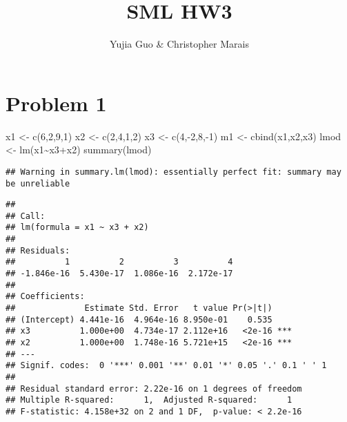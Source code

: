\documentclass[
  11pt,
]{article}
\title{SML HW3}
\author{Yujia Guo \& Christopher Marais}
\date{}
\newenvironment{Shaded}{\begin{snugshade}}{\end{snugshade}}
\newcommand{\DecValTok}[1]{\textcolor[rgb]{0.00,0.00,0.81}{#1}}
\newcommand{\FunctionTok}[1]{\textcolor[rgb]{0.00,0.00,0.00}{#1}}
\newcommand{\NormalTok}[1]{#1}
\newcommand{\OtherTok}[1]{\textcolor[rgb]{0.56,0.35,0.01}{#1}}
\newcommand{\SpecialCharTok}[1]{\textcolor[rgb]{0.00,0.00,0.00}{#1}}
\begin{document}
\maketitle

\hypertarget{problem-1}{%
\section{Problem 1}\label{problem-1}}

\begin{Shaded}
\begin{Highlighting}[]
\NormalTok{x1 }\OtherTok{\textless{}{-}} \FunctionTok{c}\NormalTok{(}\DecValTok{6}\NormalTok{,}\DecValTok{2}\NormalTok{,}\DecValTok{9}\NormalTok{,}\DecValTok{1}\NormalTok{)}
\NormalTok{x2 }\OtherTok{\textless{}{-}} \FunctionTok{c}\NormalTok{(}\DecValTok{2}\NormalTok{,}\DecValTok{4}\NormalTok{,}\DecValTok{1}\NormalTok{,}\DecValTok{2}\NormalTok{)}
\NormalTok{x3 }\OtherTok{\textless{}{-}} \FunctionTok{c}\NormalTok{(}\DecValTok{4}\NormalTok{,}\SpecialCharTok{{-}}\DecValTok{2}\NormalTok{,}\DecValTok{8}\NormalTok{,}\SpecialCharTok{{-}}\DecValTok{1}\NormalTok{)}
\NormalTok{m1 }\OtherTok{\textless{}{-}} \FunctionTok{cbind}\NormalTok{(x1,x2,x3)}
\NormalTok{lmod }\OtherTok{\textless{}{-}} \FunctionTok{lm}\NormalTok{(x1}\SpecialCharTok{\textasciitilde{}}\NormalTok{x3}\SpecialCharTok{+}\NormalTok{x2)}
\FunctionTok{summary}\NormalTok{(lmod)}
\end{Highlighting}
\end{Shaded}

\begin{verbatim}
## Warning in summary.lm(lmod): essentially perfect fit: summary may be unreliable
\end{verbatim}

\begin{verbatim}
## 
## Call:
## lm(formula = x1 ~ x3 + x2)
## 
## Residuals:
##          1          2          3          4 
## -1.846e-16  5.430e-17  1.086e-16  2.172e-17 
## 
## Coefficients:
##              Estimate Std. Error   t value Pr(>|t|)    
## (Intercept) 4.441e-16  4.964e-16 8.950e-01    0.535    
## x3          1.000e+00  4.734e-17 2.112e+16   <2e-16 ***
## x2          1.000e+00  1.748e-16 5.721e+15   <2e-16 ***
## ---
## Signif. codes:  0 '***' 0.001 '**' 0.01 '*' 0.05 '.' 0.1 ' ' 1
## 
## Residual standard error: 2.22e-16 on 1 degrees of freedom
## Multiple R-squared:      1,  Adjusted R-squared:      1 
## F-statistic: 4.158e+32 on 2 and 1 DF,  p-value: < 2.2e-16
\end{verbatim}
\end{document}
